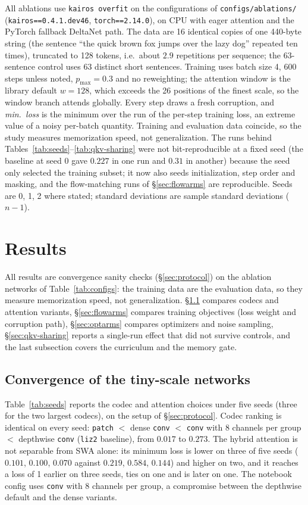 \documentclass[11pt]{article}
\begin{document}
All ablations use \texttt{kairos overfit} on the configurations of
\texttt{configs/ablations/} (\texttt{kairos==0.4.1.dev46},
\texttt{torch==2.14.0}), on CPU with eager attention and the PyTorch fallback
DeltaNet path. The data are 16 identical copies of one 440-byte string (the
sentence ``the quick brown fox jumps over the lazy dog'' repeated ten times),
truncated to 128 tokens, i.e.\ about $2.9$ repetitions per sequence; the
63-sentence control uses 63 distinct short sentences. Training uses batch
size 4, 600 steps unless noted, $p_{\max}=0.3$ and no reweighting; the
attention window is the library default $w=128$, which exceeds the 26
positions of the finest scale, so the window branch attends globally. Every
step draws a fresh corruption, and \emph{min.\ loss} is the minimum over the
run of the per-step training loss, an extreme value of a noisy per-batch
quantity. Training and evaluation data coincide, so the study measures
memorization speed, not generalization. The runs behind Tables~\ref{tab:seeds}--\ref{tab:qkv-sharing}
were not bit-reproducible at a fixed seed (the baseline at seed 0 gave $0.227$ in one run and $0.31$ in
another) because the seed only selected the training subset; it now also seeds initialization, step order and
masking, and the flow-matching runs of \S\ref{sec:flowarms} are reproducible. Seeds are 0, 1, 2 where stated; standard deviations are sample
standard deviations ($n-1$).

\section{Results}

All results are convergence sanity checks (\S\ref{sec:protocol}) on the ablation networks of
Table~\ref{tab:configs}: the training data are the evaluation data, so they measure
memorization speed, not generalization. \S\ref{sec:ablations} compares codecs and attention
variants, \S\ref{sec:flowarms} compares training objectives (loss weight and corruption path), \S\ref{sec:optarms} compares optimizers and noise sampling,
\S\ref{sec:qkv-sharing} reports a single-run effect that did not survive controls,
and the last subsection covers the curriculum and the memory gate.

\subsection{Convergence of the tiny-scale networks}
\label{sec:ablations}

Table~\ref{tab:seeds} reports the codec and attention choices under five
seeds (three for the two largest codecs), on the setup of \S\ref{sec:protocol}. Codec ranking is identical on
every seed: \texttt{patch} $<$ dense \texttt{conv} $<$ \texttt{conv} with 8
channels per group $<$ depthwise \texttt{conv} (\texttt{liz2}
baseline), from $0.017$ to $0.273$. The hybrid attention is not separable from SWA alone:
its minimum loss is lower on three of five seeds ($0.101$, $0.100$, $0.070$ against $0.219$, $0.584$,
$0.144$) and higher on two, and it reaches a loss of 1 earlier on three seeds, ties on one and is later on one. The notebook config uses \texttt{conv} with 8
channels per group, a compromise between the depthwise default and the dense
variants.
\end{document}
